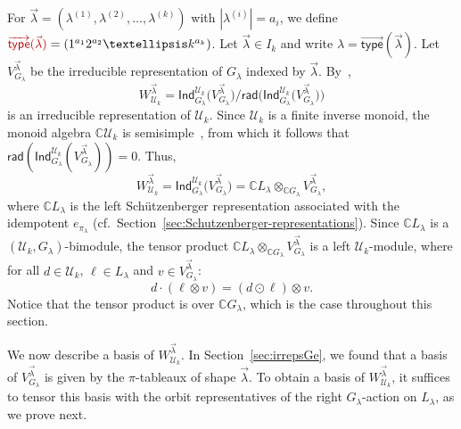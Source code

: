 \documentclass[10pt]{amsart}
\theoremstyle{definition}
\theoremstyle{remark}
\newcommand{\defncolor}{\color{darkred}}
\newcommand{\CC}{\mathbb C}
\newcommand{\vtype}{\overrightarrow{\mathsf{type}}}
\newcommand{\cf}{cf.\ }
\begin{document}
For $\vec{\lambda} = (\lambda^{(1)}, \lambda^{(2)}, \ldots, \lambda^{(k)})$ with $|\lambda^{(i)}|=a_i$,
we define ${\defncolor \vtype(\vec{\lambda})} = (1^{a_1} 2^{a_2} \ldots k^{a_k})$.
Let $\vec{\lambda} \in I_k$ and write $\lambda = \vtype(\vec{\lambda})$.
Let $V_{G_\lambda}^{\vec{\lambda}}$ be the irreducible representation of $G_\lambda$ indexed by $\vec{\lambda}$.
By~\cite[Theorem 5.5]{Steinberg.2016},
\begin{equation*}
    W_{\mathcal{U}_k}^{\vec{\lambda}} = \mathsf{Ind}_{G_\lambda}^{\mathcal{U}_k}\big(V_{G_\lambda}^{\vec{\lambda}}\big) 
    \Big/ \mathsf{rad}\Big(\mathsf{Ind}_{G_\lambda}^{\mathcal{U}_k}\big(V_{G_\lambda}^{\vec{\lambda}}\big)\Big)
\end{equation*}
is an irreducible representation of $\mathcal{U}_k$.
Since $\mathcal{U}_k$ is a finite inverse monoid, the monoid algebra
$\mathbb{C}\mathcal{U}_k$ is semisimple~\cite[Corollary~9.4]{Steinberg.2016},
from which it follows that $\mathsf{rad}(\mathsf{Ind}_{G_\lambda}^{\mathcal{U}_k}(V_{G_\lambda}^{\vec{\lambda}})) = 0$.
Thus,
\begin{equation*}
    W_{\mathcal{U}_k}^{\vec{\lambda}} = \mathsf{Ind}_{G_\lambda}^{\mathcal{U}_k}\big(V_{G_\lambda}^{\vec{\lambda}}\big) 
    = \mathbb{C}L_\lambda \otimes_{\mathbb{C}G_\lambda} V_{G_\lambda}^{\vec{\lambda}},
\end{equation*}
where $\CC L_\lambda$ is the left Sch\"utzenberger representation associated with the idempotent $e_{\pi_\lambda}$
(\cf Section~\ref{sec:Schutzenberger-representations}).
Since $\CC L_\lambda$ is a $(\mathcal{U}_k, G_\lambda)$-bimodule, the tensor product
$\mathbb{C}L_\lambda \otimes_{\mathbb{C}G_\lambda} V_{G_\lambda}^{\vec{\lambda}}$ is a left
$\mathcal{U}_k$-module, where for all $d \in \mathcal{U}_k$, $\ell \in L_\lambda$ and $v \in V_{G_\lambda}^{\vec{\lambda}}$:
\begin{equation}\label{leftaction}
	d \cdot (\ell \otimes v)  = (d \odot \ell) \otimes v.
\end{equation}
Notice that the tensor product is over $\mathbb{C}G_\lambda$, which is the case throughout this section.

We now describe a basis of $W_{\mathcal{U}_k}^{\vec{\lambda}}$.
In Section~\ref{sec:irrepsGe}, we found that a basis of
$V_{G_\lambda}^{\vec{\lambda}}$ is given by the $\pi$-tableaux of shape $\vec{\lambda}$.
To obtain a basis of $W_{\mathcal{U}_k}^{\vec{\lambda}}$, it suffices to tensor this basis with
the orbit representatives of the right $G_\lambda$-action on $L_\lambda$,
as we prove next.
\end{document}
